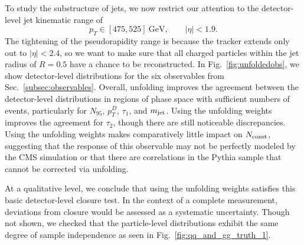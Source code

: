 \documentclass[aps,prd,twocolumn,preprintnumbers,nofootinbib,longbibliography,floatfix]{revtex4-1}
\DeclareRobustCommand{\Sec}[1]{Sec.~\ref{#1}}
\DeclareRobustCommand{\Fig}[1]{Fig.~\ref{#1}}
\newcommand{\GeV}{\text{GeV}}
\newcommand{\Pythia}{{\sc Pythia}\xspace}
\newcommand{\cor}[1]{#1}
\begin{document}
To study the substructure of jets, we now restrict our attention to the detector-level jet kinematic range of
%
\begin{equation}
	p_T \in [475,525]~\GeV, \qquad |\eta| < 1.9.
\end{equation}
%
The tightening of the pseudorapidity range is because the tracker extends only out to $|\eta| < 2.4$, so we want to make sure that all charged particles within the jet radius of $R = 0.5$ have a chance to be reconstructed.
%
In \Fig{fig:unfoldedobs}, we show detector-level distributions for the six observables from \Sec{subsec:observables}.
%
Overall, unfolding improves the agreement between the detector-level distributions in regions of phase space with sufficient numbers of events, particularly for $N_{95}$, $p_T^D$, $\tau_1$, and $m_{\rm jet}$.
%
\cor{Using the unfolding weights} improves the agreement for $\tau_2$, though there are still noticeable discrepancies.
%
\cor{Using the unfolding weights} makes comparatively little impact on $N_{\rm const}$, %
\cor{suggesting that the response of this observable may not be perfectly modeled by the CMS simulation or that there are correlations in the Pythia sample that cannot be corrected via unfolding.}


At a qualitative level, we conclude that %
\cor{using the unfolding weights} satisfies this basic detector-level closure test.
%
In the context of a complete measurement, deviations from closure would be assessed as a systematic uncertainty.
%
Though not shown, we checked that the particle-level distributions exhibit the same degree of sample independence as seen in \Fig{fig:qq_and_gg_truth_1}.



\begin{figure*}[p]
	\centering
	$\quad$
	\\
	$\quad$
	\caption{Similar to \Fig{fig:forw_vs_cent_gen}, but for the four machine-learned observables from \Sec{subsec:observables}:  (a) PFN classification, (b) PFN regression, (c) EFN classification, and (d) EFN regression.
%
The uncertainties include fully correlated uncertainties from the training.
%
For an individual training, there is better separation power than implied here.
%
For visual clarity, we have omitted the \Pythia distributions from the top panels.
	}
	\label{fig:forw_vs_cent_ML_obses}
\end{figure*}
\end{document}

